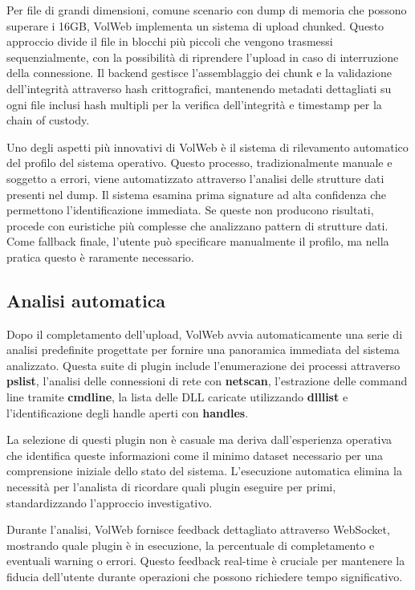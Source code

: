 Per file di grandi dimensioni, comune scenario con dump di memoria che possono superare i 16GB, VolWeb implementa un sistema di upload chunked. Questo approccio divide il file in blocchi più piccoli che vengono trasmessi sequenzialmente, con la possibilità di riprendere l'upload in caso di interruzione della connessione. Il backend gestisce l'assemblaggio dei chunk e la validazione dell'integrità attraverso hash crittografici, mantenendo metadati dettagliati su ogni file inclusi hash multipli per la verifica dell'integrità e timestamp per la chain of custody.

Uno degli aspetti più innovativi di VolWeb è il sistema di rilevamento automatico del profilo del sistema operativo. Questo processo, tradizionalmente manuale e soggetto a errori, viene automatizzato attraverso l'analisi delle strutture dati presenti nel dump. Il sistema esamina prima signature ad alta confidenza che permettono l'identificazione immediata. Se queste non producono risultati, procede con euristiche più complesse che analizzano pattern di strutture dati. Come fallback finale, l'utente può specificare manualmente il profilo, ma nella pratica questo è raramente necessario.

\subsection{Analisi automatica}

Dopo il completamento dell'upload, VolWeb avvia automaticamente una serie di analisi predefinite progettate per fornire una panoramica immediata del sistema analizzato. Questa suite di plugin include l'enumerazione dei processi attraverso \textbf{pslist}, l'analisi delle connessioni di rete con \textbf{netscan}, l'estrazione delle command line tramite \textbf{cmdline}, la lista delle DLL caricate utilizzando \textbf{dlllist} e l'identificazione degli handle aperti con \textbf{handles}.

La selezione di questi plugin non è casuale ma deriva dall'esperienza operativa che identifica queste informazioni come il minimo dataset necessario per una comprensione iniziale dello stato del sistema. L'esecuzione automatica elimina la necessità per l'analista di ricordare quali plugin eseguire per primi, standardizzando l'approccio investigativo.

Durante l'analisi, VolWeb fornisce feedback dettagliato attraverso WebSocket, mostrando quale plugin è in esecuzione, la percentuale di completamento e eventuali warning o errori. Questo feedback real-time è cruciale per mantenere la fiducia dell'utente durante operazioni che possono richiedere tempo significativo.

